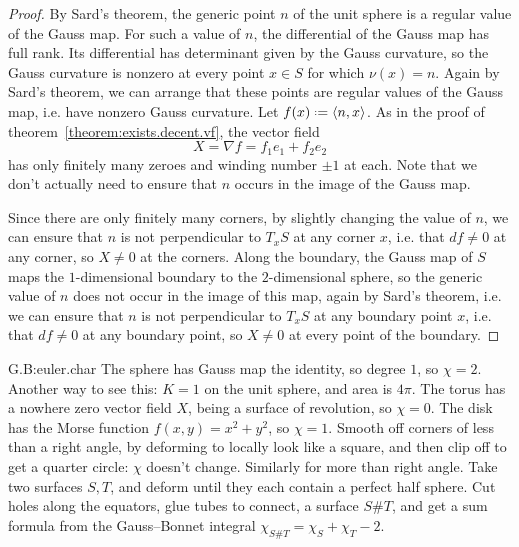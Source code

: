 \begin{proof}
By Sard's theorem, the generic point \(n\) of the unit sphere is a regular value of the Gauss map.
For such a value of \(n\), the differential of the Gauss map has full rank.
Its differential has determinant given by the Gauss curvature, so the Gauss curvature is nonzero at every point \(x \in S\) for which \(\nu(x)=n\).
Again by Sard's theorem, we can arrange that these points are regular values of the Gauss map, i.e. have nonzero Gauss curvature.
Let \(f(x) \defeq \ip{n}{x}\).
As in the proof of theorem~\vref{theorem:exists.decent.vf}, the vector field 
\[
X=\nabla f = f_1 e_1 + f_2 e_2
\]
has only finitely many zeroes and winding number \(\pm 1\) at each.
Note that we don't actually need to ensure that \(n\) occurs in the image of the Gauss map.

Since there are only finitely many corners, by slightly changing the value of \(n\), we can ensure that \(n\) is not perpendicular to \(T_x S\) at any corner \(x\), i.e. that \(df \ne 0\) at any corner, so \(X\ne 0\) at the corners.
Along the boundary, the Gauss map of \(S\) maps the \(1\)-dimensional boundary to the \(2\)-dimensional sphere, so the generic value of \(n\) does not occur in the image of this map, again by Sard's theorem, i.e. we can ensure that \(n\) is not perpendicular to \(T_x S\) at any boundary point \(x\), i.e. that \(df \ne 0\) at any boundary point, so \(X\ne 0\) at every point of the boundary.
\end{proof}
\begin{answer}{G.B:euler.char}
The sphere has Gauss map the identity, so degree \(1\), so \(\chi=2\).
Another way to see this: \(K=1\) on the unit sphere, and area is \(4 \pi\).
The torus has a nowhere zero vector field \(X\), being a surface of revolution, so \(\chi=0\).
The disk has the Morse function \(f(x,y)=x^2+y^2\), so \(\chi=1\).
Smooth off corners of less than a right angle, by deforming to locally look like a square, and then clip off to get a quarter circle: \(\chi\) doesn't change.
Similarly for more than right angle.
Take two surfaces \(S,T\), and deform until they each contain a perfect half sphere.
Cut holes along the equators, glue tubes to connect, a surface \(S\# T\), and get a sum formula from the Gauss--Bonnet integral \(\chi_{S\# T}=\chi_S+\chi_T-2\).
\end{answer}